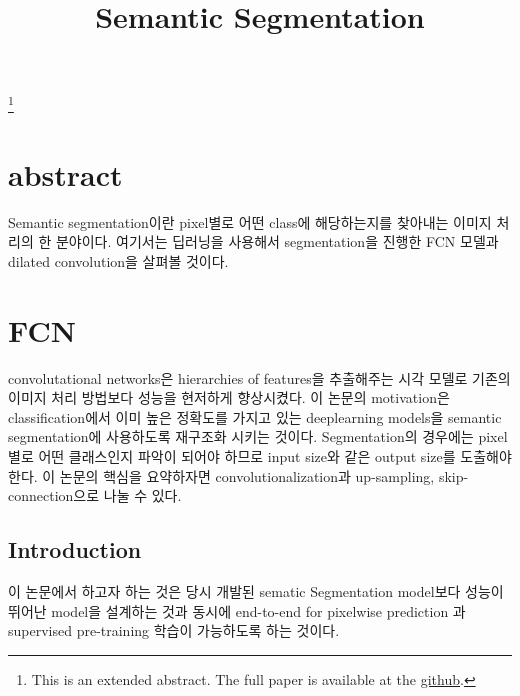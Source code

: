 \documentclass[extendedabs]{bmvc2k}
\begin{document}
\title{Semantic Segmentation}
\maketitle
\let\thefootnote\relax\footnote{This is an extended abstract. The full paper is available at the \href{https://github.com/LeeGwanHui/TIL/tree/main/deeplearning_ham}{github}. }
\vspace{-0.2in}

\section{abstract}

\quad Semantic segmentation이란 pixel별로 어떤 class에 해당하는지를 찾아내는 이미지 처리의 한 분야이다. 여기서는 딥러닝을 사용해서
segmentation을 진행한 FCN 모델과 dilated convolution을 살펴볼 것이다. 

\section{FCN\cite{long2015fully}}
\quad convolutational networks은 hierarchies of features을 추출해주는 시각 모델로 기존의 이미지 처리 방법보다 성능을 현저하게 향상시켰다.
이 논문의 motivation은 classification에서 이미 높은 정확도를 가지고 있는 deeplearning models을 semantic segmentation에 사용하도록 재구조화 시키는 것이다.
Segmentation의 경우에는 pixel별로 어떤 클래스인지 파악이 되어야 하므로 input size와 같은 output size를 도출해야한다. 이 논문의 핵심을 요약하자면
convolutionalization과 up-sampling, skip-connection으로 나눌 수 있다. 
 \subsection{Introduction}
 \quad 이 논문에서 하고자 하는 것은 당시 개발된 sematic Segmentation model보다 성능이 뛰어난 model을 
 설계하는 것과 동시에 end-to-end for pixelwise prediction 과 supervised pre-training 학습이 가능하도록 하는 것이다.
\end{document}

